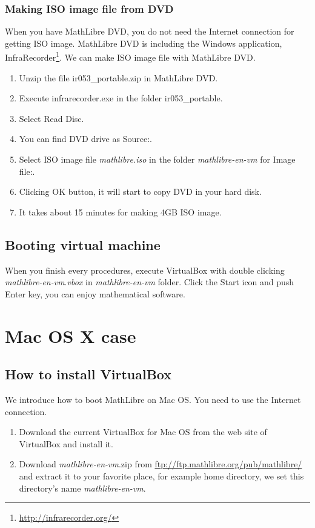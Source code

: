\documentclass[a4]{article}
\newcommand{\ir}{ir053\_portable}
\newcommand{\vm}{{\em mathlibre-en-vm}}
\begin{document}
\subsubsection{Making ISO image file from DVD}
When you have MathLibre DVD, 
you do not need the Internet connection for getting ISO image.
MathLibre DVD is including the Windows application, InfraRecorder\footnote{\url{http://infrarecorder.org/}}.
We can make ISO image file with MathLibre DVD.
\begin{enumerate}
 \item Unzip the file \ir.zip{} in MathLibre DVD.
 \item Execute infrarecorder.exe in the folder \ir.
 \item Select Read Disc.
 \item You can find DVD drive as Source:.
 \item Select ISO image file {\em mathlibre.iso} in the folder \vm{} for Image file:.
 \item Clicking OK button, it will start to copy DVD in your hard disk.
 \item It takes about 15 minutes for making 4GB ISO image.
\end{enumerate}

\subsection{Booting virtual machine}
When you finish every procedures,
execute VirtualBox with double clicking \vm.{\em vbox} in \vm{} folder.
Click the Start icon and push Enter key, you can enjoy mathematical software.

\section{Mac OS X case}
\subsection{How to install VirtualBox}
We introduce how to boot MathLibre on Mac OS.
You need to use the Internet connection.
\begin{enumerate}
 \item Download the current VirtualBox for Mac OS from the web site of VirtualBox and install it.
 \item Download \vm.zip{} from
       \url{ftp://ftp.mathlibre.org/pub/mathlibre/} and extract it to
       your favorite place, for example home directory, we set this
       directory's name \vm.
\end{enumerate}
\end{document}
